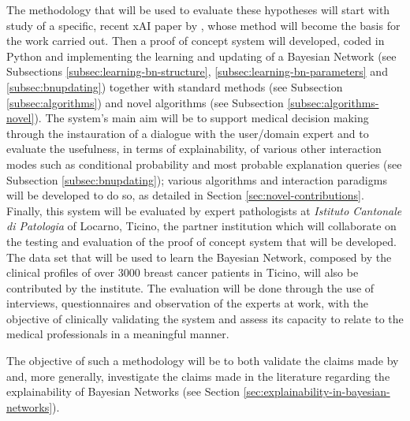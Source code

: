 The methodology that will be used to evaluate these hypotheses will start with study of a specific, recent xAI paper by \citet{Butz2018}, whose method will become the basis for the work carried out.
Then a proof of concept system will developed, coded in Python and implementing the learning and updating of a Bayesian Network (see Subsections \ref{subsec:learning-bn-structure}, \ref{subsec:learning-bn-parameters} and \ref{subsec:bnupdating}) together with standard methods (see Subsection \ref{subsec:algorithms}) and novel algorithms (see Subsection \ref{subsec:algorithms-novel}).
The system's main aim will be to support medical decision making through the instauration of a dialogue with the user/domain expert and to evaluate the usefulness, in terms of explainability, of various other interaction modes such as conditional probability and most probable explanation queries (see Subsection \ref{subsec:bnupdating}); various algorithms and interaction paradigms will be developed to do so, as detailed in Section \ref{sec:novel-contributions}.
Finally, this system will be evaluated by expert pathologists at \textit{Istituto Cantonale di Patologia} of Locarno, Ticino, the partner institution which will collaborate on the testing and evaluation of the proof of concept system that will be developed.
The data set that will be used to learn the Bayesian Network, composed by the clinical profiles of over 3000 breast cancer patients in Ticino, will also be contributed by the institute.
The evaluation will be done through the use of interviews, questionnaires and observation of the experts at work, with the objective of clinically validating the system and assess its capacity to relate to the medical professionals in a meaningful manner.

The objective of such a methodology will be to both validate the claims made by \citet{Butz2018} and, more generally, investigate the claims made in the literature regarding the explainability of Bayesian Networks (see Section \ref{sec:explainability-in-bayesian-networks}).